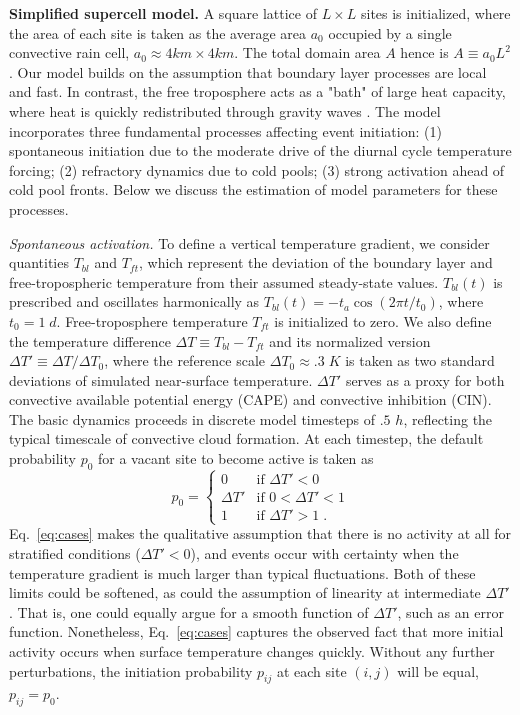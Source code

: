 \documentclass[draft,linenumbers]{agujournal2019}
\begin{document}
\noindent
{\bf Simplified supercell model.}
A square lattice of $L\times L$ sites is initialized, where the area of each site is taken as the average area $a_0$ occupied by a single convective rain cell, $a_0\approx 4km\times 4km$. 
The total domain area $A$ hence is $A\equiv a_0L^2$.
Our model builds on the assumption that boundary layer processes are local and fast. In contrast, the free troposphere acts as a "bath" of large heat capacity, where heat is quickly redistributed through gravity waves \cite{bretherton1989gravity}. 
The model incorporates three fundamental processes affecting event initiation: 
(1) spontaneous initiation due to the moderate drive of the diurnal cycle temperature forcing;
(2) refractory dynamics due to cold pools; 
(3) strong activation ahead of cold pool fronts.
Below we discuss the estimation of model parameters for these processes.

\noindent
{\it Spontaneous activation.}
To define a vertical temperature gradient, we consider quantities $T_{bl}$ and $T_{ft}$, which represent the deviation of the boundary layer and free-tropospheric temperature from their assumed steady-state values.
$T_{bl}(t)$ is prescribed and oscillates harmonically as $T_{bl}(t)=-t_a \cos (2\pi t/t_0)$, where $t_0=1\;d$.
Free-troposphere temperature $T_{ft}$ is initialized to zero.
We also define the temperature difference $\Delta T\equiv T_{bl}-T_{ft}$ and its normalized version $\Delta T'\equiv \Delta T/\Delta T_0$, where the reference scale $\Delta T_0\approx .3\;K$ is taken as two standard deviations of simulated near-surface temperature.
$\Delta T'$ serves as a proxy for both convective available potential energy (CAPE) and convective inhibition (CIN).
The basic dynamics proceeds in discrete model timesteps of $.5$ $h$, reflecting the typical timescale of convective cloud formation. 
At each timestep, the default probability $p_0$ for a vacant site to become active is taken as
\begin{equation}
    p_0=\begin{cases}
    0 & \text{if $\Delta T'<0$}\\
    \Delta T' & \text{if $0<\Delta T'<1$}\\
    1 & \text{if $\Delta T'>1$}\;.
    \end{cases}
    \label{eq:cases}
\end{equation}
Eq.~\ref{eq:cases} makes the qualitative assumption that there is no activity at all for stratified conditions ($\Delta T'<0$), and events occur with certainty when the temperature gradient is much larger than typical fluctuations. 
Both of these limits could be softened, as could the assumption of linearity at intermediate $\Delta T'$. That is, one could equally argue for a smooth function of $\Delta T'$, such as an error function. 
Nonetheless, Eq.~\ref{eq:cases} captures the observed fact that more initial activity occurs when surface temperature changes quickly.
Without any further perturbations, the initiation probability $p_{ij}$ at each site $(i,j)$ will be equal, $p_{ij}=p_0$.
\end{document}
